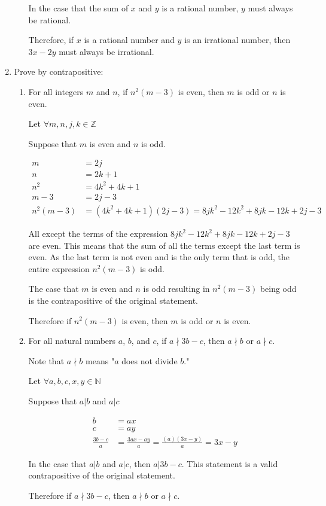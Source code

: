 \documentclass[12pt,letterpaper,titlepage]{article}
\begin{document}
\begin{raggedright}
\begin{enumerate}
\begin{enumerate}[label=(\alph*)]
In the case that the sum of $x$ and $y$ is a rational number, $y$ must always be rational.

Therefore, if $x$ is a rational number and $y$ is an irrational number, then $3x-2y$ must always be irrational. 
\end{enumerate}

\clearpage
\item Prove by contrapositive:
\begin{enumerate}[label=(\alph*)]
\item For all integers $m$ and $n$, if $n^2 (m − 3)$ is even, then $m$ is odd or $n$ is even.

Let $\forall m, n, j, k \in \mathbb{Z}$

Suppose that $m$ is even and $n$ is odd.

\begin{align*}
   m &= 2j
\\ n &= 2k+1
\\ n^2 &= 4k^2 + 4k + 1
\\ m - 3 &= 2j - 3
\\ n^2 (m-3) &= (4k^2+4k+1)(2j-3) = 8 j k^2 - 12 k^2 + 8 j k - 12 k + 2 j - 3
\end{align*}

All except the terms of the expression $8 j k^2 - 12 k^2 + 8 j k - 12 k + 2 j - 3$ are even. This means that the sum of all the terms except the last term is even. As the last term is not even and is the only term that is odd, the entire expression $n^2(m-3)$ is odd.

The case that $m$ is even and $n$ is odd resulting in $n^2(m-3)$ being odd is the contrapositive of the original statement. 

Therefore if $n^2 (m − 3)$ is even, then $m$ is odd or $n$ is even.

\item For all natural numbers $a$, $b$, and $c$, if $a \nmid 3b − c$, then $a \nmid b$ or $a \nmid c$. 

Note that $a \nmid b$ means "$a$ does not divide $b$."

Let $\forall a, b, c, x, y \in \mathbb{N}$

Suppose that $a | b$ and $a | c$

\begin{align*}
   b &= ax
\\ c &= ay
\\ \frac{3b-c}{a} &= \frac{3ax-ay}{a} = \frac{(a)(3x-y)}{a} = 3x-y
\end{align*}

In the case that $a | b$ and $a | c$, then $a | 3b-c$. This statement is a valid contrapositive of the original statement.

Therefore if $a \nmid 3b − c$, then $a \nmid b$ or $a \nmid c$.

\end{enumerate}
\end{enumerate}
\end{raggedright}
\end{document}

